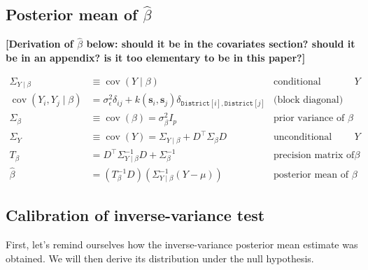 \documentclass[letter]{article}
\newcommand{\genericdel}[3]{%
      \left#1#3\right#2
    }
\newcommand{\del}[1]{\genericdel(){#1}}
\newcommand{\sbr}[1]{\genericdel[]{#1}}
\DeclareMathOperator{\cov}{{cov}}
\newcommand{\district}{\mathtt{District}}
\newcommand{\trans}{^{\intercal}}
\newcommand{\sigman}{\sigma_{\epsilon}}
\newcommand{\svec}{\mathbold{s}}
\begin{document}
    	\subsection{\texorpdfstring{Posterior mean of
\(\hat\beta\)}{Posterior mean of \textbackslash{}hat\textbackslash{}beta}}\label{posterior-mean-of-hatbeta}

\textbf{{[}Derivation of \(\hat{\beta}\) below: should it be in the
covariates section? should it be in an appendix? is it too elementary to
be in this paper?{]}}

\begin{equation}
\begin{aligned}
    \Sigma_{Y \mid \beta} &\equiv \cov\del{Y \mid \beta } 
        & \text{conditional variance of $Y$} \\
    \cov\del{Y_i , Y_j \mid \beta } &= \sigman^2 \delta_{ij} + k\del{\svec_i,\svec_j} \delta_{\district\sbr{i},\district\sbr{j}} & \text{(block diagonal)}\\
    \Sigma_\beta &\equiv \cov\del{\beta} = \sigma_\beta^2 I_p
        & \text{prior variance of $\beta$} \\
    \Sigma_Y &\equiv \cov\del{Y} = \Sigma_{Y \mid \beta} + D\trans \Sigma_\beta D
        & \text{unconditional variance of $Y$} \\
    T_\beta &= D\trans \Sigma_{Y \mid \beta}^{-1} D + \Sigma^{-1}_\beta 
        & \text{precision matrix of $\beta$} \\
    \hat\beta &= \del{T_\beta^{-1} D} \del{ \Sigma_{Y \mid \beta}^{-1} \del{Y-\mu}}
        & \text{posterior mean of $\beta$}
\end{aligned}
\end{equation}
    


    	\subsection{Calibration of inverse-variance
test}\label{calibration-of-inverse-variance-test}

First, let's remind ourselves how the inverse-variance posterior mean
estimate was obtained. We will then derive its distribution under the
null hypothesis.
\end{document}
